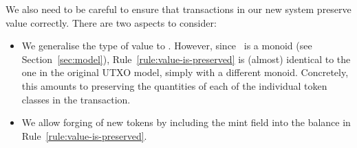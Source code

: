 We also need to be careful to ensure that transactions in our new system preserve value correctly.
There are two aspects to consider:
\begin{itemize}
\item
  We generalise the type of value to \Quantities.
  However, since \Quantities\ is a monoid (see Section~\ref{sec:model}), Rule~\ref{rule:value-is-preserved} is (almost) identical to the one in the original UTXO model, simply with a different monoid.
  Concretely, this amounts to preserving the quantities of each of the individual token classes in the transaction.
\item
  We allow forging of new tokens by including the mint field into the balance in Rule~\ref{rule:value-is-preserved}.
\end{itemize}
